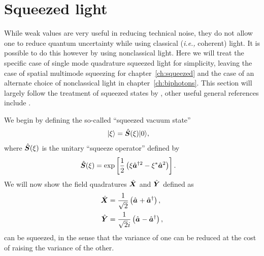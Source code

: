 \section{Squeezed light}
While weak values are very useful in reducing technical noise, they do not allow one to reduce quantum uncertainty while using classical (\emph{i.e.,} coherent) light.  It is possible to do this however by using nonclassical light.  Here we will treat the specific case of single mode quadrature squeezed light for simplicity, leaving the case of spatial multimode squeezing for chapter~\ref{ch:squeezed} and the case of an alternate choice of nonclassical light in chapter~\ref{ch:biphotons}.  This section will largely follow the treatment of squeezed states by \cite{Agarwal2013}, other useful general references include \cite{Mandel1995, Loudon2000}.

We begin by defining the so-called ``squeezed vacuum state''
\begin{align}
  \lvert \xi\rangle &= \hat{\bm S}(\xi)\lvert 0\rangle,
\end{align}
where $\hat{\bm S}(\xi)$ is the unitary ``squeeze operator'' defined by
\begin{align}
  \hat{\bm S}(\xi) &= \exp\left[\frac{1}{2}\left(\xi\hat{\bm a}^{\dagger 2} - \xi^{*}\hat{\bm a}^2 \right) \right].
\end{align}
We will now show the field quadratures $\hat{\bm X}$ and $\hat{\bm Y}$ defined as
\begin{align}\label{eq:quadratures}
  \hat{\bm X} &= \frac{1}{\sqrt{2}} \left(\hat{\bm a}_{} + \hat{\bm a}^\dagger_{} \right), \nonumber \\
  \hat{\bm Y} &= \frac{1}{\sqrt{2}i} \left(\hat{\bm a}_{} - \hat{\bm a}^\dagger_{} \right),
\end{align}
can be squeezed, in the sense that the variance of one can be reduced at the cost of raising the variance of the other.


